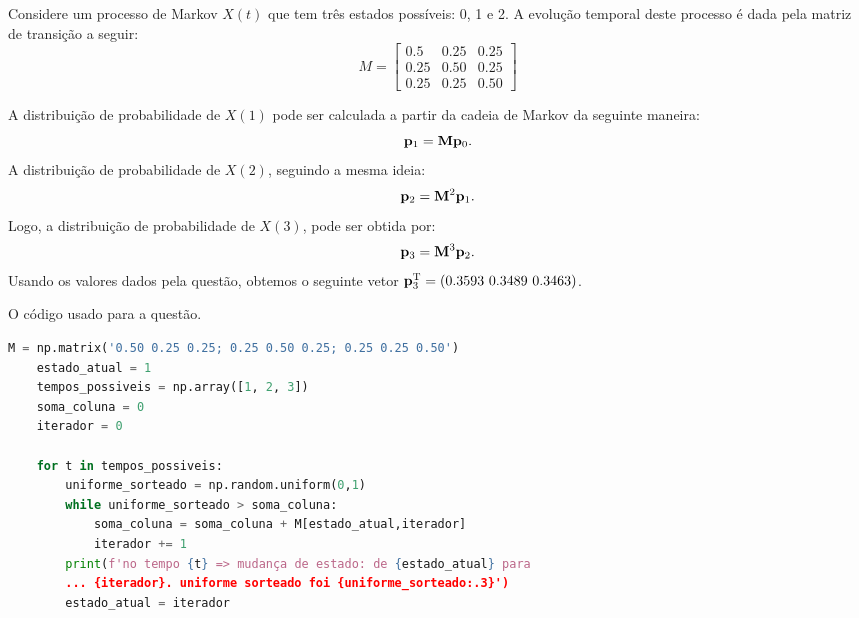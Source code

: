 \documentclass{homeworkclass}
\begin{document}
\begin{homeworkProblem}

Considere um processo de Markov $X(t)$ que tem três estados possíveis: 0, 1 e 2. A evolução temporal deste processo é dada pela matriz de transição a seguir:
\begin{equation*}
M = \begin{bmatrix}
0.5 & 0.25 & 0.25 \\
0.25 & 0.50 & 0.25 \\
0.25 & 0.25 & 0.50
\end{bmatrix}
\end{equation*}
\begin{homeworkSection}[a) Considerando que a distribuição de probabilidade de $X(0)$ é dada pelo vetor $\pbf_{0} = \left( 0.3 \, \, 0.4 \, \, 0.3 \right)^{\Trm}$, calcule a distribuição de probabilidade de $X(3)$ (ou seja, do processo de Markov no instante $t = 3$).]

A distribuição de probabilidade de $X(1)$ pode ser calculada a partir da cadeia de Markov da seguinte maneira:
\begin{equation*}
	\mathbf{p}_{1} = \mathbf{M} \mathbf{p}_{0}.
\end{equation*}
A distribuição de probabilidade de $X(2)$, seguindo a mesma ideia:
\begin{equation*}
	\mathbf{p}_{2} = \mathbf{M}^{2} \mathbf{p}_{1}.
\end{equation*}
Logo, a distribuição de probabilidade de $X(3)$, pode ser obtida por:
\begin{equation*}
	\mathbf{p}_{3} = \mathbf{M}^{3} \mathbf{p}_{2}.
\end{equation*}
Usando os valores dados pela questão, obtemos o seguinte vetor $\mathbf{p}_{3}^{\mathrm{T}} = \left( 0.3593 \, \, 0.3489 \, \, 0.3463 \right)$.
\end{homeworkSection}


\begin{homeworkSection}[b)Iniciando em $X(0) = 1$, e usando um gerador de números aleatórios (são necessários apenas três números aleatórios equiprováveis), calcule manualmente uma amostra do processo X(t) até $t = 3$.]

O código usado para a questão.
\begin{lstlisting}[language=Python]
	M = np.matrix('0.50 0.25 0.25; 0.25 0.50 0.25; 0.25 0.25 0.50')
	estado_atual = 1
	tempos_possiveis = np.array([1, 2, 3])
	soma_coluna = 0
	iterador = 0

	for t in tempos_possiveis:
		uniforme_sorteado = np.random.uniform(0,1)
		while uniforme_sorteado > soma_coluna:
			soma_coluna = soma_coluna + M[estado_atual,iterador]
			iterador += 1
		print(f'no tempo {t} => mudança de estado: de {estado_atual} para
		... {iterador}. uniforme sorteado foi {uniforme_sorteado:.3}')
		estado_atual = iterador
\end{lstlisting}


\end{homeworkSection}
\end{homeworkProblem}
\end{document}
